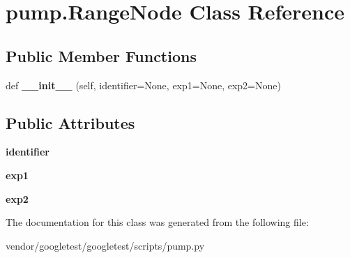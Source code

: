 \hypertarget{classpump_1_1RangeNode}{}\section{pump.\+Range\+Node Class Reference}
\label{classpump_1_1RangeNode}
\subsection*{Public Member Functions}
\begin{DoxyCompactItemize}
\item 
def {\bfseries \+\_\+\+\_\+init\+\_\+\+\_\+} (self, identifier=None, exp1=None, exp2=None)\hypertarget{classpump_1_1RangeNode_a58e85945a5a6e2f899e8243422c871e3}{}\label{classpump_1_1RangeNode_a58e85945a5a6e2f899e8243422c871e3}

\end{DoxyCompactItemize}
\subsection*{Public Attributes}
\begin{DoxyCompactItemize}
\item 
{\bfseries identifier}\hypertarget{classpump_1_1RangeNode_ae75b9f31ba8c3bd048cf09b22035efa0}{}\label{classpump_1_1RangeNode_ae75b9f31ba8c3bd048cf09b22035efa0}

\item 
{\bfseries exp1}\hypertarget{classpump_1_1RangeNode_acbb59f8c5e23d23563ca03f21574ce63}{}\label{classpump_1_1RangeNode_acbb59f8c5e23d23563ca03f21574ce63}

\item 
{\bfseries exp2}\hypertarget{classpump_1_1RangeNode_afe153ee472b121652a51c62c1522cc13}{}\label{classpump_1_1RangeNode_afe153ee472b121652a51c62c1522cc13}

\end{DoxyCompactItemize}


The documentation for this class was generated from the following file\+:\begin{DoxyCompactItemize}
\item 
vendor/googletest/googletest/scripts/pump.\+py\end{DoxyCompactItemize}
